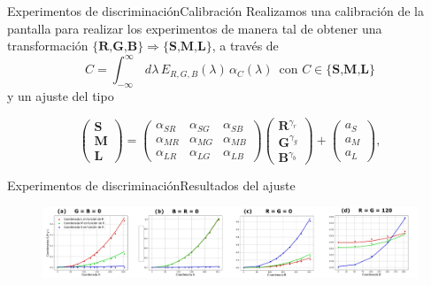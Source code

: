 \documentclass[
    11pt, %
    aspectratio=169, %
]{beamer}
\begin{document}
 \begin{frame}{Experimentos de discriminación}{Calibración}
     Realizamos una calibración de la pantalla para realizar los experimentos de manera tal de obtener una transformación $\{\textbf{R,G,B}\} \Rightarrow \{\textbf{S,M,L}\}$, a través de
     \begin{equation*}
         C = \int_{-\infty}^{\infty}\, d\lambda \, E_{R,G,B}(\lambda) \, \alpha_C(\lambda) \,\text{       con }C  \in \{\textbf{S,M,L}\}
     \end{equation*}
     y un ajuste del tipo
     
     \begin{equation*}
    \begin{pmatrix}
        \mathbf{S} \\ 
        \mathbf{M} \\ 
        \mathbf{L}
    \end{pmatrix} = \begin{pmatrix}
        \alpha_{SR} & \alpha_{SG} & \alpha_{SB} \\ \alpha_{MR} & \alpha_{MG} & \alpha_{MB} \\ \alpha_{LR} & \alpha_{LG} & \alpha_{LB}  
    \end{pmatrix} \begin{pmatrix}
        \mathbf{R}^{\gamma_r} \\ 
        \mathbf{G}^{\gamma_g} \\ 
        \mathbf{B}^{\gamma_b}
    \end{pmatrix} + \begin{pmatrix}
        a_S \\ a_M \\ a_L
    \end{pmatrix},
\end{equation*}
\end{frame}

\begin{frame}{Experimentos de discriminación}{Resultados del ajuste}
    \begin{figure}
        \centering
        \includegraphics[width = 15cm]{Images/experimental/ajuste.pdf}
    \end{figure}
\end{frame}
\end{document}
